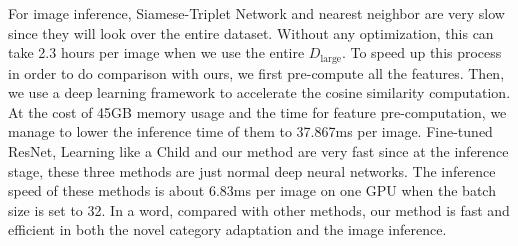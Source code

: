 For image inference, Siamese-Triplet Network and nearest neighbor are very slow since they will look over the entire dataset. Without any optimization, this can take 2.3 hours per image when we use the entire $D_{\text{large}}$.
To speed up this process in order to do comparison with ours, we first pre-compute all the features.
Then, we use a deep learning framework to accelerate the cosine similarity computation.
At the cost of 45GB memory usage and the time for feature pre-computation, we manage to lower the inference time of them to 37.867ms per image.
Fine-tuned ResNet, Learning like a Child and our method are very fast since at the inference stage, these three methods are just normal deep neural networks.
The inference speed of these methods is about 6.83ms per image on one GPU when the batch size is set to 32.
In a word, compared with other methods, our method is fast and efficient in both the novel category adaptation and the image inference.

